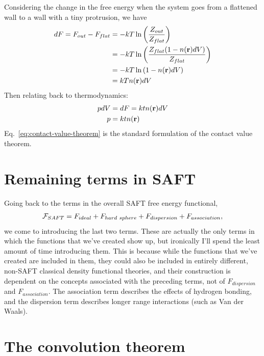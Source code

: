 Considering the change in the free energy when the system goes from a
flattened wall to a wall with a tiny protrusion, we have
\begin{align}
  dF = F_{out} - F_{flat} &= -kT \ln \left( \frac{Z_{out}}{Z_{flat}} \right) \notag \\
  &= -kT \ln \left( \frac{Z_{flat} (1-n(\textbf{r})dV)}{Z_{flat}} \right) \notag \\
  &= -kT \ln \left( 1-n(\textbf{r})dV \right) \notag \\
  &= kTn(\textbf{r})dV
\end{align}
Then relating back to thermodynamics:
\begin{align}
  pdV &= dF = ktn(\textbf{r})dV \\
  \label{eq:contact-value-theorem}
  p &= ktn(\textbf{r})
\end{align}
Eq.~\ref{eq:contact-value-theorem} is the standard formulation of the
contact value theorem.



\clearpage
\newpage

\section{Remaining terms in SAFT}

Going back to the terms in the overall SAFT free energy functional,
\begin{align}
  \mathcal{F}_{SAFT} = F_{ideal} + F_{hard~sphere} +  F_{dispersion} + F_{association},
\end{align}
we come to introducing the last two terms.  These are actually the
only terms in which the functions that we've created show up, but
ironically I'll spend the least amount of time introducing them.  This
is because while the functions that we've created are included in
them, they could also be included in entirely different, non-SAFT
classical density functional theories, and their construction is
dependent on the concepts associated with the preceding terms, not of
$F_{dispersion}$ and $F_{association}$. The association term describes
the effects of hydrogen bonding, and the dispersion term describes
longer range interactions (such as Van der Waals).

\clearpage
\newpage

\section{The convolution theorem}

